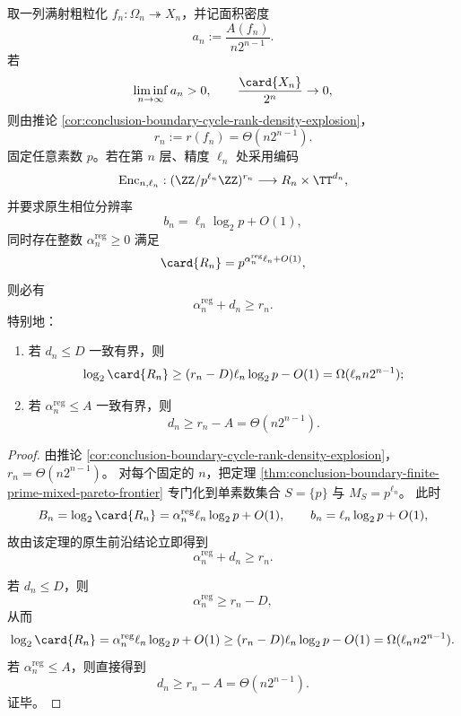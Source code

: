 \begin{theorem}\label{thm:conclusion-boundary-native-budget-explosion}
取一列满射粗粒化 \(f_n:\Omega_n\twoheadrightarrow X_n\)，并记面积密度
\[
a_n:=\frac{A(f_n)}{n2^{n-1}}.
\]
若
\[
\liminf_{n\to\infty}a_n>0,
\qquad
\frac{\card{X_n}}{2^n}\to 0,
\]
则由推论 \ref{cor:conclusion-boundary-cycle-rank-density-explosion}，
\[
r_n:=r(f_n)=\Theta(n2^{n-1}).
\]
固定任意素数 \(p\)。若在第 \(n\) 层、精度 \(\ell_n\) 处采用编码
\[
\mathrm{Enc}_{n,\ell_n}:(\ZZ/p^{\ell_n}\ZZ)^{r_n}\longrightarrow R_n\times \TT^{d_n},
\]
并要求原生相位分辨率
\[
b_n=\ell_n\log_2 p+O(1),
\]
同时存在整数 \(\alpha_n^{\mathrm{reg}}\ge 0\) 满足
\[
\card{R_n}=p^{\alpha_n^{\mathrm{reg}}\ell_n+O(1)},
\]
则必有
\[
\boxed{\;
\alpha_n^{\mathrm{reg}}+d_n\ge r_n.
\;}
\]
特别地：
\begin{enumerate}
  \item 若 \(d_n\le D\) 一致有界，则
  \[
  \log_2\card{R_n}
  \ge
  (r_n-D)\ell_n\log_2 p-O(1)
  =
  \Omega(\ell_n n2^{n-1});
  \]
  \item 若 \(\alpha_n^{\mathrm{reg}}\le A\) 一致有界，则
  \[
  d_n\ge r_n-A=\Theta(n2^{n-1}).
  \]
\end{enumerate}
\end{theorem}
\begin{proof}
由推论 \ref{cor:conclusion-boundary-cycle-rank-density-explosion}，
\(
r_n=\Theta(n2^{n-1})
\)。
对每个固定的 \(n\)，把定理 \ref{thm:conclusion-boundary-finite-prime-mixed-pareto-frontier} 专门化到单素数集合 \(S=\{p\}\) 与 \(M_S=p^{\ell_n}\)。
此时
\[
B_n=\log_2\card{R_n}
=
\alpha_n^{\mathrm{reg}}\ell_n\log_2 p+O(1),
\qquad
b_n=\ell_n\log_2 p+O(1),
\]
故由该定理的原生前沿结论立即得到
\[
\alpha_n^{\mathrm{reg}}+d_n\ge r_n.
\]

若 \(d_n\le D\)，则
\[
\alpha_n^{\mathrm{reg}}\ge r_n-D,
\]
从而
\[
\log_2\card{R_n}
=
\alpha_n^{\mathrm{reg}}\ell_n\log_2 p+O(1)
\ge
(r_n-D)\ell_n\log_2 p-O(1)
=
\Omega(\ell_n n2^{n-1}).
\]
若 \(\alpha_n^{\mathrm{reg}}\le A\)，则直接得到
\[
d_n\ge r_n-A=\Theta(n2^{n-1}).
\]
证毕。
\end{proof}

